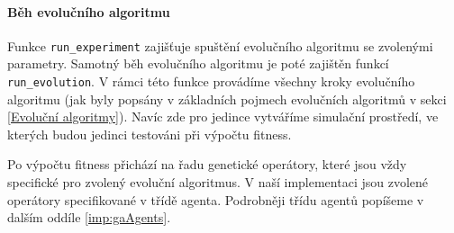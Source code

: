 
\paragraph{Běh evolučního algoritmu}
Funkce \texttt{run\_experiment} zajišťuje spuštění evolučního algoritmu se
zvolenými parametry. Samotný běh evolučního algoritmu je poté zajištěn funkcí
\texttt{run\_evolution}. V rámci této funkce provádíme všechny kroky evolučního
algoritmu (jak byly popsány v základních pojmech evolučních algoritmů v sekci
\ref{Evoluční algoritmy}). Navíc zde pro jedince vytváříme simulační prostředí,
ve kterých budou jedinci testováni při výpočtu fitness.

Po výpočtu fitness přichází na řadu genetické operátory, které jsou vždy
specifické pro zvolený evoluční algoritmus. V naší implementaci jsou zvolené
operátory specifikované v třídě agenta. Podrobněji třídu agentů
popíšeme v dalším oddíle \ref{imp:gaAgents}.

